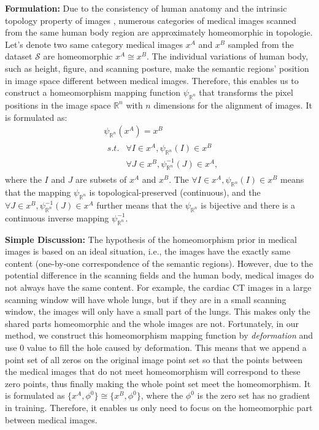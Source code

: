 \textbf{Formulation:} Due to the consistency of human anatomy and the intrinsic topology property of images \cite{kong1989digital}, numerous categories of medical images scanned from the same human body region are approximately homeomorphic in topologie. Let's denote two same category medical images $x^{A}$ and $x^{B}$ sampled from the dataset $\mathcal{S}$ are homeomorphic $x^{A}\cong x^{B}$. The individual variations of human body, such as height, figure, and scanning posture, make the semantic regions' position in image space different between medical images. Therefore, this enables us to construct a homeomorphism mapping function $\psi_{\mathbb{R}^{n}}$ that transforms the pixel positions in the image space $\mathbb{R}^{n}$ with $n$ dimensions for the alignment of images. It is formulated as:
\begin{equation}\label{equ:trans}
\begin{aligned}
&\psi_{\mathbb{R}^{n}}(x^{A})=x^{B}\\
&\begin{array}{ll}
s.t. & \forall I\in x^{A},\psi_{\mathbb{R}^{n}}(I)\in x^{B}\\
     & \forall J\in x^{B},\psi^{-1}_{\mathbb{R}^{n}}(J)\in x^{A},
\end{array}
\end{aligned}
\end{equation}
where the $I$ and $J$ are subsets of $x^{A}$ and $x^{B}$. The $\forall I\in x^{A},\psi_{\mathbb{R}^{n}}(I)\in x^{B}$ means that the mapping $\psi_{\mathbb{R}^{n}}$ is topological-preserved (continuous), and the $\forall J\in x^{B},\psi^{-1}_{\mathbb{R}^{n}}(J)\in x^{A}$ further means that the $\psi_{\mathbb{R}^{n}}$ is bijective and there is a continuous inverse mapping $\psi^{-1}_{\mathbb{R}^{n}}$.

\textbf{Simple Discussion:} The hypothesis of the homeomorphism prior in medical images is based on an ideal situation, i.e., the images have the exactly same content (one-by-one correspondence of the semantic regions). However, due to the potential difference in the scanning fields and the human body, medical images do not always have the same content. For example, the cardiac CT images in a large scanning window will have whole lungs, but if they are in a small scanning window, the images will only have a small part of the lungs. This makes only the shared parts homeomorphic and the whole images are not. Fortunately, in our method, we construct this homeomorphism mapping function by \emph{deformation} and use 0 value to fill the hole caused by deformation. This means that we append a point set of all zeros on the original image point set so that the points between the medical images that do not meet homeomorphism will correspond to these zero points, thus finally making the whole point set meet the homeomorphism. It is formulated as $\{x^{A},\phi^{0}\}\cong\{x^{B},\phi^{0}\}$, where the $\phi^{0}$ is the zero set has no gradient in training. Therefore, it enables us only need to focus on the homeomorphic part between medical images.

